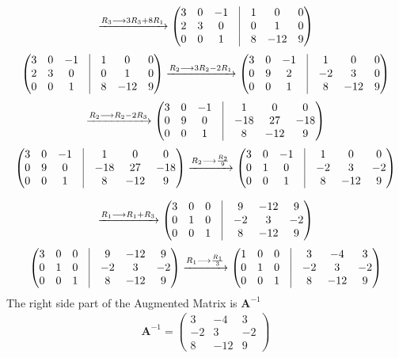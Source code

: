 \documentclass{beamer}
\theoremstyle{remark}
\newcommand{\myvec}[1]{\ensuremath{\begin{pmatrix}#1\end{pmatrix}}}
\let\vec\mathbf
\numberwithin{equation}{section}
\begin{document}
       \begin{frame}
       \begin{align}
       \xrightarrow{R_3 \longrightarrow 3R_3+8R_1}
       \myvec{3&0&-1 &\vrule& 1&0&0 \\
       2&3&0 &\vrule&  0&1&0 \\
       0&0&1 &\vrule&  8&-12&9} 
\end{align}
\begin{align}
 \myvec{3&0&-1 &\vrule& 1&0&0 \\
       2&3&0 &\vrule&  0&1&0 \\
       0&0&1 &\vrule&  8&-12&9} \xrightarrow{R_2 \longrightarrow 3R_2-2R_1}
    \myvec{3&0&-1 &\vrule& 1&0&0 \\
       0&9&2 &\vrule&  -2&3&0 \\
       0&0&1 &\vrule&  8&-12&9} 
       \end{align}
       \begin{align}
       \xrightarrow{R_2 \longrightarrow R_2-2R_3}
        \myvec{3&0&-1 &\vrule& 1&0&0 \\
       0&9&0 &\vrule&  -18&27&-18 \\
       0&0&1 &\vrule&  8&-12&9} 
\end{align}
\begin{align}
 \myvec{3&0&-1 &\vrule& 1&0&0 \\
       0&9&0 &\vrule&  -18&27&-18 \\
       0&0&1 &\vrule&  8&-12&9} \xrightarrow{R_2 \longrightarrow \frac{R_2}{9}}
        \myvec{3&0&-1 &\vrule& 1&0&0 \\
       0&1&0 &\vrule&  -2&3&-2 \\
       0&0&1 &\vrule&  8&-12&9} 
       \end{align}
       \end{frame}
       \begin{frame}
       \begin{align}
       \xrightarrow{R_1 \longrightarrow R_1+R_3}
        \myvec{3&0&0 &\vrule& 9&-12&9 \\
       0&1&0 &\vrule&  -2&3&-2 \\
       0&0&1 &\vrule&  8&-12&9} 
\end{align}
\begin{align}
\myvec{3&0&0 &\vrule& 9&-12&9 \\
       0&1&0 &\vrule&  -2&3&-2 \\
       0&0&1 &\vrule&  8&-12&9} \xrightarrow{R_1 \longrightarrow \frac{R_1}{3}}
       \myvec{1&0&0 &\vrule& 3&-4&3 \\
       0&1&0 &\vrule&  -2&3&-2 \\
       0&0&1 &\vrule&  8&-12&9} 
\end{align}
The right side part of the Augmented Matrix is $\vec{A}^{-1}$
\begin{align}
\vec{A}^{-1} = \myvec{3&-4&3\\
                      -2&3&-2\\
                      8&-12&9}
\end{align}

\end{frame}
\end{document}
